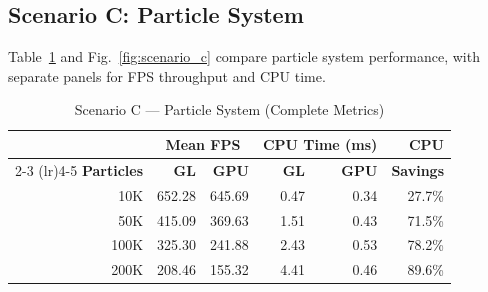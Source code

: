 \documentclass[conference]{IEEEtran}
\begin{document}
\subsection{Scenario C: Particle System}

Table~\ref{tab:scenario_c} and Fig.~\ref{fig:scenario_c} compare particle system performance, with separate panels for FPS throughput and CPU time.

\begin{table}[htbp]
\caption{Scenario C --- Particle System (Complete Metrics)}
\label{tab:scenario_c}
\centering
\small
\begin{tabular}{@{}rrrrrr@{}}
\toprule
 & \multicolumn{2}{c}{\textbf{Mean FPS}} & \multicolumn{2}{c}{\textbf{CPU Time (ms)}} & \textbf{CPU} \\
\cmidrule(lr){2-3} \cmidrule(lr){4-5}
\textbf{Particles} & \textbf{GL} & \textbf{GPU} & \textbf{GL} & \textbf{GPU} & \textbf{Savings} \\
\midrule
10K & 652.28 & 645.69 & 0.47 & 0.34 & 27.7\% \\
50K & 415.09 & 369.63 & 1.51 & 0.43 & 71.5\% \\
100K & 325.30 & 241.88 & 2.43 & 0.53 & 78.2\% \\
200K & 208.46 & 155.32 & 4.41 & 0.46 & 89.6\% \\
\bottomrule
\end{tabular}
\end{table}
\end{document}
